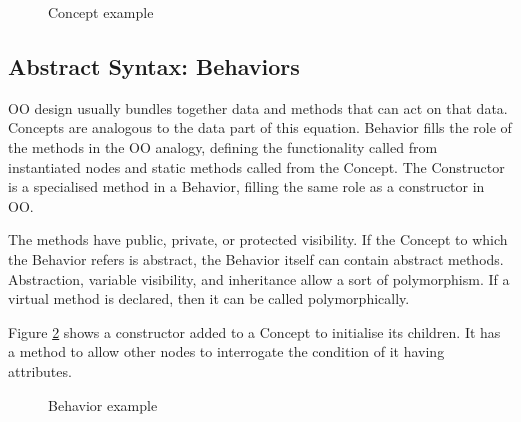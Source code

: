 \begin{figure}[h]
    \centering
    \caption{Concept example}
    \label{fig:concept_example}
\end{figure}
 
\subsection{Abstract Syntax: Behaviors}
OO design usually bundles together data and methods that can act on that data.
Concepts are analogous to the data part of this equation.
Behavior fills the role of the methods in the OO analogy, defining the functionality called from instantiated nodes and static methods called from the Concept.
The Constructor is a specialised method in a Behavior, filling the same role as a constructor in OO.

The methods have public, private, or protected visibility.
If the Concept to which the Behavior refers is abstract, the Behavior itself can contain abstract methods.
Abstraction, variable visibility, and inheritance allow a sort of polymorphism.
If a virtual method is declared, then it can be called polymorphically.

Figure \ref{fig:behavior_example} shows a constructor added to a Concept to initialise its children.
It has a method to allow other nodes to interrogate the condition of it having attributes.

\begin{figure}[h]
    \centering
    \caption{Behavior example}
    \label{fig:behavior_example}
\end{figure}

